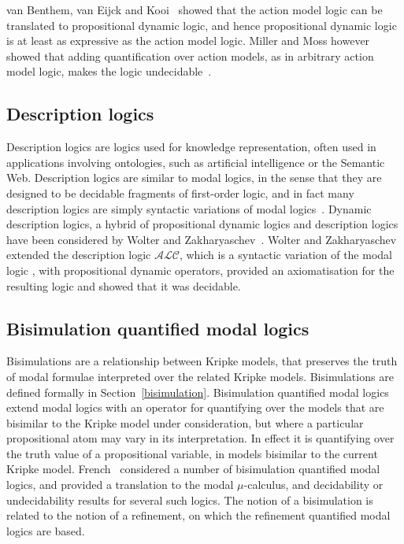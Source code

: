 van Benthem, van Eijck and Kooi~\cite{vanbenthem2006logics} showed that the
action model logic can be translated to propositional dynamic logic, and hence
propositional dynamic logic is at least as expressive as the action model logic.
Miller and Moss however showed that adding quantification over action models,
as in arbitrary action model logic, makes the logic
undecidable~\cite{miller2005undecidability}.

\subsection{Description logics}

Description logics are logics used for knowledge representation, often used in
applications involving ontologies, such as artificial intelligence or the
Semantic Web. Description logics are similar to modal logics, in the sense that
they are designed to be decidable fragments of first-order logic, and in fact
many description logics are simply syntactic variations of modal
logics~\cite{blackburn2002modal}. Dynamic description logics, a hybrid of
propositional dynamic logics and description logics have been considered by
Wolter and Zakharyaschev~\cite{wolter1998dynamic}. Wolter and Zakharyaschev
extended the description logic $\mathcal{ALC}$, which is a syntactic variation of
the modal logic \logicK{}, with propositional dynamic operators, provided an
axiomatisation for the resulting logic and showed that it was decidable.

\subsection{Bisimulation quantified modal logics}

Bisimulations are a relationship between Kripke models, that preserves the truth
of modal formulae interpreted over the related Kripke models. Bisimulations are
defined formally in Section~\ref{bisimulation}. Bisimulation quantified modal
logics extend modal logics with an operator for quantifying over the models that
are bisimilar to the Kripke model under consideration, but where a particular
propositional atom may vary in its interpretation. In effect it is quantifying
over the truth value of a propositional variable, in models bisimilar to the
current Kripke model.  French~\cite{french2006bisimulation} considered a number
of bisimulation quantified modal logics, and provided a translation to the
modal $\mu$-calculus, and decidability or undecidability results for several
such logics. The notion of a bisimulation is related to the notion of a
refinement, on which the refinement quantified modal logics are based.


